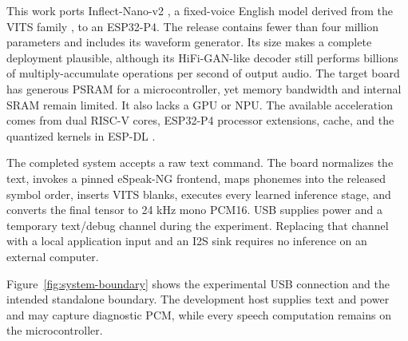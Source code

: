 \documentclass[10pt]{article}
\newcommand{\model}{Inflect-Nano-v2}
\begin{document}
This work ports \model{} \cite{song2026inflect}, a fixed-voice English model
derived from the VITS family \cite{kim2021vits}, to an ESP32-P4. The release
contains fewer than four million parameters and includes its waveform
generator. Its size makes a complete deployment plausible, although its
HiFi-GAN-like decoder \cite{kong2020hifigan} still performs billions of
multiply-accumulate operations per second of output audio. The target board
has generous PSRAM for a microcontroller, yet memory bandwidth and internal
SRAM remain limited. It also lacks a GPU or NPU. The available acceleration
comes from dual RISC-V cores, ESP32-P4 processor extensions, cache, and the
quantized kernels in ESP-DL \cite{espressif2026espdl,espressif2026espidf}.

The completed system accepts a raw text command. The board normalizes the
text, invokes a pinned eSpeak-NG frontend, maps phonemes into the released
symbol order, inserts VITS blanks, executes every learned inference stage,
and converts the final tensor to 24 kHz mono PCM16. USB supplies power and a
temporary text/debug channel during the experiment. Replacing that channel
with a local application input and an I2S sink requires no inference on an
external computer.

Figure~\ref{fig:system-boundary} shows the experimental USB connection and
the intended standalone boundary. The development host supplies text and
power and may capture diagnostic PCM, while every speech computation remains
on the microcontroller.
\end{document}
